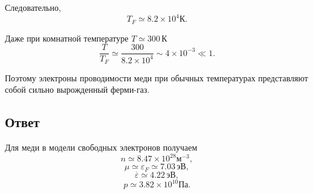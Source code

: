\documentclass[../final.tex]{subfiles}
\begin{document}
Следовательно,
%
\begin{equation*}
    \boxed{
        T_F
        \simeq
        8.2\times10^4
        \text{К}
    }.
\end{equation*}

Даже при комнатной температуре $T\simeq300\,\text{К}$
%
\begin{equation*}
    \frac{T}{T_F}
    \simeq
    \frac{
        300
    }{
        8.2\times10^4
    }
    \sim
    4\times10^{-3}
    \ll
    1.
\end{equation*}

Поэтому электроны проводимости меди при обычных температурах
представляют собой сильно вырожденный ферми-газ.



\subsection*{Ответ}

Для меди в модели свободных электронов получаем
%
\begin{equation*}
    \boxed{
        n
        \simeq
        8.47\times10^{28}
        \text{м}^{-3}
    },
\end{equation*}
%
%
\begin{equation*}
    \boxed{
        \mu
        \simeq
        \varepsilon_F
        \simeq
        7.03\,\text{эВ}
    },
\end{equation*}
%
%
\begin{equation*}
    \boxed{
        \overline{\varepsilon}
        \simeq
        4.22\,\text{эВ}
    },
\end{equation*}
%
%
\begin{equation*}
    \boxed{
        p
        \simeq
        3.82\times10^{10}
        \text{Па}
    }.
\end{equation*}
\end{document}
